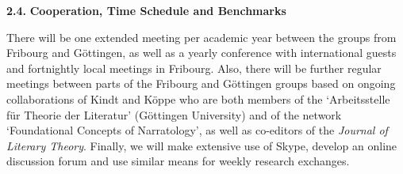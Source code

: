 
\vspace{.2cm}
{\textbf{2.4.  }}\textbf{Cooperation, Time Schedule and Benchmarks}
\vspace{.2cm}

\noindent There will be one extended meeting per academic year between the groups from Fribourg and G\"ottingen, as well as a yearly conference with international guests and fortnightly local meetings in Fribourg. Also, there will be further regular meetings between parts of the Fribourg and G\"ottingen groups based on ongoing collaborations of Kindt and K\"oppe who are both members of the `Arbeitsstelle f\"ur Theorie der Literatur' (G\"ottingen University) and of the network `Foundational Concepts of Narratology', as well as co-editors of the \emph{Journal of Literary Theory}. Finally, we will make extensive use of Skype, develop an online discussion forum and use similar means for weekly research exchanges.

\vspace{.5cm}
\setlength{\parindent}{-20pt}
\setlength{\parindent}{10pt}


